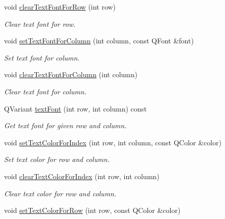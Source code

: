 \begin{DoxyCompactItemize}
void \hyperlink{class_mdt_1_1_item_model_1_1_format_proxy_model_af1f739ca97dcb54421a66adcb30f3c9c}{clear\+Text\+Font\+For\+Row} (int row)
\begin{DoxyCompactList}\small\item\em Clear text font for row. \end{DoxyCompactList}\item 
void \hyperlink{class_mdt_1_1_item_model_1_1_format_proxy_model_a268258d64a08ff3d2cee5973b4a8e4bb}{set\+Text\+Font\+For\+Column} (int column, const Q\+Font \&font)
\begin{DoxyCompactList}\small\item\em Set text font for column. \end{DoxyCompactList}\item 
void \hyperlink{class_mdt_1_1_item_model_1_1_format_proxy_model_abcd9ff8788ef27646a9a97cb1a1813ce}{clear\+Text\+Font\+For\+Column} (int column)
\begin{DoxyCompactList}\small\item\em Clear text font for column. \end{DoxyCompactList}\item 
Q\+Variant \hyperlink{class_mdt_1_1_item_model_1_1_format_proxy_model_a561d611642ffd421a05aa086dcdb3a08}{text\+Font} (int row, int column) const 
\begin{DoxyCompactList}\small\item\em Get text font for given row and column. \end{DoxyCompactList}\item 
void \hyperlink{class_mdt_1_1_item_model_1_1_format_proxy_model_a801186850e88fea034397e1835d8f4ea}{set\+Text\+Color\+For\+Index} (int row, int column, const Q\+Color \&color)
\begin{DoxyCompactList}\small\item\em Set text color for row and column. \end{DoxyCompactList}\item 
void \hyperlink{class_mdt_1_1_item_model_1_1_format_proxy_model_aabb8d96355e15448204cb17425a3e229}{clear\+Text\+Color\+For\+Index} (int row, int column)
\begin{DoxyCompactList}\small\item\em Clear text color for row and column. \end{DoxyCompactList}\item 
void \hyperlink{class_mdt_1_1_item_model_1_1_format_proxy_model_a0e31b6b7d689d8d4b2890e255e7d943d}{set\+Text\+Color\+For\+Row} (int row, const Q\+Color \&color)

\end{DoxyCompactItemize}
